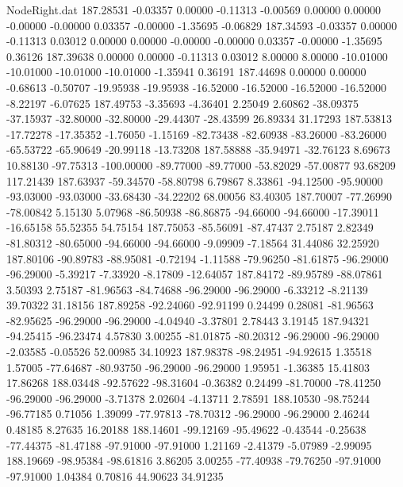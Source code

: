 \begin{filecontents}{NodeRight.dat}
 187.28531   -0.03357    0.00000    -0.11313   -0.00569    0.00000    0.00000   -0.00000   -0.00000    0.03357   -0.00000   -1.35695   -0.06829
 187.34593   -0.03357    0.00000    -0.11313    0.03012    0.00000    0.00000   -0.00000   -0.00000    0.03357   -0.00000   -1.35695    0.36126
 187.39638    0.00000    0.00000    -0.11313    0.03012    8.00000    8.00000  -10.01000  -10.01000  -10.01000  -10.01000   -1.35941    0.36191
 187.44698    0.00000    0.00000    -0.68613   -0.50707  -19.95938  -19.95938  -16.52000  -16.52000  -16.52000  -16.52000   -8.22197   -6.07625
 187.49753   -3.35693   -4.36401     2.25049    2.60862  -38.09375  -37.15937  -32.80000  -32.80000  -29.44307  -28.43599   26.89334   31.17293
 187.53813  -17.72278  -17.35352    -1.76050   -1.15169  -82.73438  -82.60938  -83.26000  -83.26000  -65.53722  -65.90649  -20.99118  -13.73208
 187.58888  -35.94971  -32.76123     8.69673   10.88130  -97.75313 -100.00000  -89.77000  -89.77000  -53.82029  -57.00877   93.68209  117.21439
 187.63937  -59.34570  -58.80798     6.79867    8.33861  -94.12500  -95.90000  -93.03000  -93.03000  -33.68430  -34.22202   68.00056   83.40305
 187.70007  -77.26990  -78.00842     5.15130    5.07968  -86.50938  -86.86875  -94.66000  -94.66000  -17.39011  -16.65158   55.52355   54.75154
 187.75053  -85.56091  -87.47437     2.75187    2.82349  -81.80312  -80.65000  -94.66000  -94.66000   -9.09909   -7.18564   31.44086   32.25920
 187.80106  -90.89783  -88.95081    -0.72194   -1.11588  -79.96250  -81.61875  -96.29000  -96.29000   -5.39217   -7.33920   -8.17809  -12.64057
 187.84172  -89.95789  -88.07861     3.50393    2.75187  -81.96563  -84.74688  -96.29000  -96.29000   -6.33212   -8.21139   39.70322   31.18156
 187.89258  -92.24060  -92.91199     0.24499    0.28081  -81.96563  -82.95625  -96.29000  -96.29000   -4.04940   -3.37801    2.78443    3.19145
 187.94321  -94.25415  -96.23474     4.57830    3.00255  -81.01875  -80.20312  -96.29000  -96.29000   -2.03585   -0.05526   52.00985   34.10923
 187.98378  -98.24951  -94.92615     1.35518    1.57005  -77.64687  -80.93750  -96.29000  -96.29000    1.95951   -1.36385   15.41803   17.86268
 188.03448  -92.57622  -98.31604    -0.36382    0.24499  -81.70000  -78.41250  -96.29000  -96.29000   -3.71378    2.02604   -4.13711    2.78591
 188.10530  -98.75244  -96.77185     0.71056    1.39099  -77.97813  -78.70312  -96.29000  -96.29000    2.46244    0.48185    8.27635   16.20188
 188.14601  -99.12169  -95.49622    -0.43544   -0.25638  -77.44375  -81.47188  -97.91000  -97.91000    1.21169   -2.41379   -5.07989   -2.99095
 188.19669  -98.95384  -98.61816     3.86205    3.00255  -77.40938  -79.76250  -97.91000  -97.91000    1.04384    0.70816   44.90623   34.91235

\end{filecontents}
